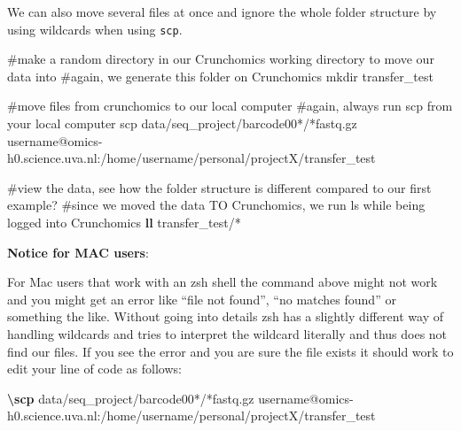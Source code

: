 \documentclass[
  letterpaper,
  DIV=11,
  numbers=noendperiod]{scrreprt}
\newenvironment{Shaded}{}{}
\newcommand{\CommentTok}[1]{\textcolor[rgb]{0.42,0.45,0.49}{#1}}
\newcommand{\ExtensionTok}[1]{\textcolor[rgb]{0.84,0.23,0.29}{\textbf{#1}}}
\newcommand{\FunctionTok}[1]{\textcolor[rgb]{0.44,0.26,0.76}{#1}}
\newcommand{\NormalTok}[1]{\textcolor[rgb]{0.14,0.16,0.18}{#1}}
\newcommand{\PreprocessorTok}[1]{\textcolor[rgb]{0.84,0.23,0.29}{#1}}
\begin{document}
\begin{tcolorbox}[enhanced jigsaw, colframe=quarto-callout-tip-color-frame, title=\textcolor{quarto-callout-tip-color}{\faLightbulb}\hspace{0.5em}{Tip: Moving data from the HPC using wildcards}, titlerule=0mm, toptitle=1mm, left=2mm, colbacktitle=quarto-callout-tip-color!10!white, bottomtitle=1mm, coltitle=black, breakable, colback=white, arc=.35mm, bottomrule=.15mm, rightrule=.15mm, leftrule=.75mm, opacityback=0, toprule=.15mm, opacitybacktitle=0.6]

We can also move several files at once and ignore the whole folder
structure by using wildcards when using \texttt{scp}.

\begin{Shaded}
\begin{Highlighting}[]
\CommentTok{\#make a random directory in our Crunchomics working directory to move our data into}
\CommentTok{\#again, we generate this folder on Crunchomics}
\FunctionTok{mkdir}\NormalTok{ transfer\_test}

\CommentTok{\#move files from crunchomics to our local computer}
\CommentTok{\#again, always run scp from your local computer}
\FunctionTok{scp}\NormalTok{ data/seq\_project/barcode00}\PreprocessorTok{*}\NormalTok{/}\PreprocessorTok{*}\NormalTok{fastq.gz username@omics{-}h0.science.uva.nl:/home/username/personal/projectX/transfer\_test}

\CommentTok{\#view the data, see how the folder structure is different compared to our first example? }
\CommentTok{\#since we moved the data TO Crunchomics, we run ls while being logged into Crunchomics}
\ExtensionTok{ll}\NormalTok{ transfer\_test/}\PreprocessorTok{*}
\end{Highlighting}
\end{Shaded}

\textbf{Notice for MAC users}:

For Mac users that work with an zsh shell the command above might not
work and you might get an error like ``file not found'', ``no matches
found'' or something the like. Without going into details zsh has a
slightly different way of handling wildcards and tries to interpret the
wildcard literally and thus does not find our files. If you see the
error and you are sure the file exists it should work to edit your line
of code as follows:

\begin{Shaded}
\begin{Highlighting}[]
\ExtensionTok{\textbackslash{}scp}\NormalTok{  data/seq\_project/barcode00}\PreprocessorTok{*}\NormalTok{/}\PreprocessorTok{*}\NormalTok{fastq.gz username@omics{-}h0.science.uva.nl:/home/username/personal/projectX/transfer\_test}
\end{Highlighting}
\end{Shaded}


\end{tcolorbox}
\end{document}
